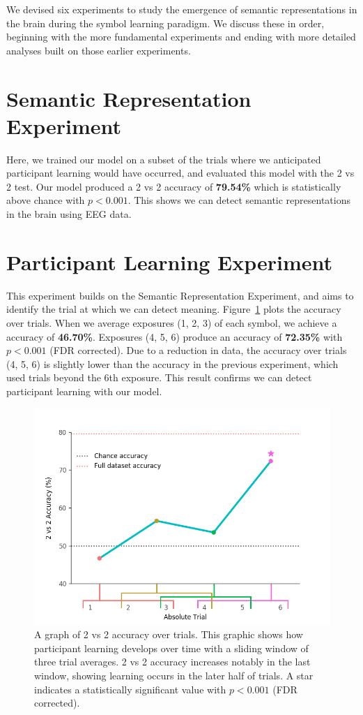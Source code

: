 \label{chapter:results}

We devised six experiments to study the emergence of semantic representations 
in the brain during the symbol learning paradigm. We discuss these in order, 
beginning with the more fundamental experiments and ending with more detailed 
analyses built on those earlier experiments.

%
  
\section{Semantic Representation Experiment} Here, we trained our model on a 
subset of the trials where we anticipated participant learning would have 
occurred, and evaluated this model with the 2 vs 2 test. Our model produced a 2 
vs 2 accuracy of \textbf{79.54\%} which is statistically above chance with $p < 
0.001$. This shows we can detect semantic representations in the brain using 
EEG data.

\section{Participant Learning Experiment} This experiment builds on the 
Semantic Representation Experiment, and aims to identify the trial at which we 
can detect meaning. Figure~\ref{fig:learning} plots the \tvt accuracy over 
trials.  When we average exposures (1, 2, 3) of each symbol, we achieve a  \tvt 
accuracy of \textbf{46.70\%}. Exposures (4, 5, 6) produce an accuracy of 
\textbf{72.35\%} with $p < 0.001$ (FDR corrected). Due to a reduction in data, 
the \tvt accuracy over trials (4, 5, 6) is slightly lower than the \tvt 
accuracy in the previous experiment, which used trials beyond the 6th exposure.  
This result confirms we can detect participant learning with our model.

\begin{figure}[t]
  \centering
  \includegraphics[width=0.75\linewidth]{figures/learning}
  \caption{A graph of 2 vs 2 accuracy over trials. This graphic shows how participant learning develops over time with a sliding window of three trial averages. 2 vs 2 accuracy increases notably in the last window, showing learning occurs in the later half of trials. A star indicates a statistically significant value with $p < 0.001$ (FDR corrected).}
  \label{fig:learning}
\end{figure}

